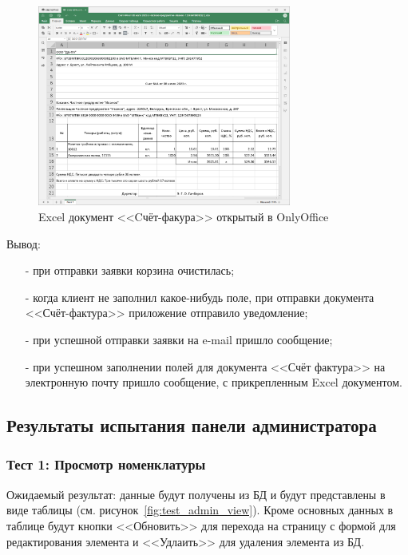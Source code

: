 \begin{figure}[!htb]\centering

    \includegraphics[height=6.6cm]
    {images/mobile/order/order-email-4.png}

    \caption{Excel документ <<Cчёт-факура>> открытый в OnlyOffice}
    \label{fig:test_order_excel}
\end{figure}

Вывод:

\begin{itemize}
    \item[-] при отправки заявки корзина очистилась;
    \item[-] когда клиент не заполнил какое-нибудь поле, при отправки документа <<Счёт-фактура>>
    приложение отправило уведомление;
    \item[-] при успешной отправки заявки на e-mail пришло сообщение;
    \item[-] при успешном заполнении полей для документа <<Счёт фактура>> на электронную почту пришло сообщение,
    с прикрепленным Excel документом.
\end{itemize}

\subsection{Результаты испытания панели администратора}

\subsubsection*{Тест 1: Просмотр номенклатуры}

Ожидаемый результат: данные будут получены из БД и будут представлены в виде таблицы (см. рисунок~\ref{fig:test_admin_view}).
Кроме основных данных в таблице будут кнопки <<Обновить>> для перехода на страницу с формой для редактирования элемента и <<Удлаить>> для удаления элемента из БД.

